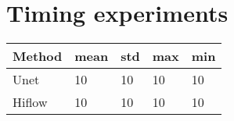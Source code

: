 \documentclass{llncs}
\begin{document}
\section{Timing experiments}
\label{sec:orge340138}
\begin{center}
\begin{tabular}{@{}p{2cm}|p{1.5cm}p{1.5cm}p{1.5cm}p{1.5cm}@{}}
  \toprule
  Method & mean & std & max & min \\
  \midrule
  Unet & 10 & 10 & 10 & 10 \\[1ex]
  Hiflow & 10 & 10 & 10 & 10 \\[1ex]
  \bottomrule
               
\end{tabular}
\end{center}
\end{document}
